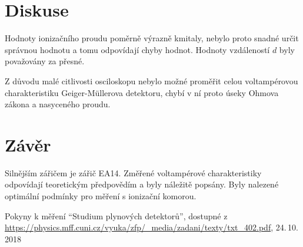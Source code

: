 \documentclass{protokol}
\begin{document}
    \section*{Diskuse}
    
      Hodnoty ionizačního proudu poměrně výrazně kmitaly, nebylo proto snadné určit správnou hodnotu a tomu odpovídají chyby hodnot. Hodnoty vzdáleností $d$ byly považovány za přesné.

      Z důvodu malé citlivosti osciloskopu nebylo možné proměřit celou voltampérovou charakteristiku Geiger-Müllerova detektoru, chybí v ní proto úseky Ohmova zákona a nasyceného proudu.

  \section*{Závěr}

    Silnějším zářičem je zářič EA14. Změřené voltampérové charakteristiky odpovídají teoretickým předpovědím a byly náležitě popsány. Byly nalezené optimální podmínky pro měření s ionizační komorou.


  \begin{thebibliography}{}
 
    Pokyny k měření ``Studium plynových detektorů'', dostupné z\\ \url{https://physics.mff.cuni.cz/vyuka/zfp/_media/zadani/texty/txt_402.pdf}, 24.\,10.\,2018
   
  \end{thebibliography}
\end{document}
